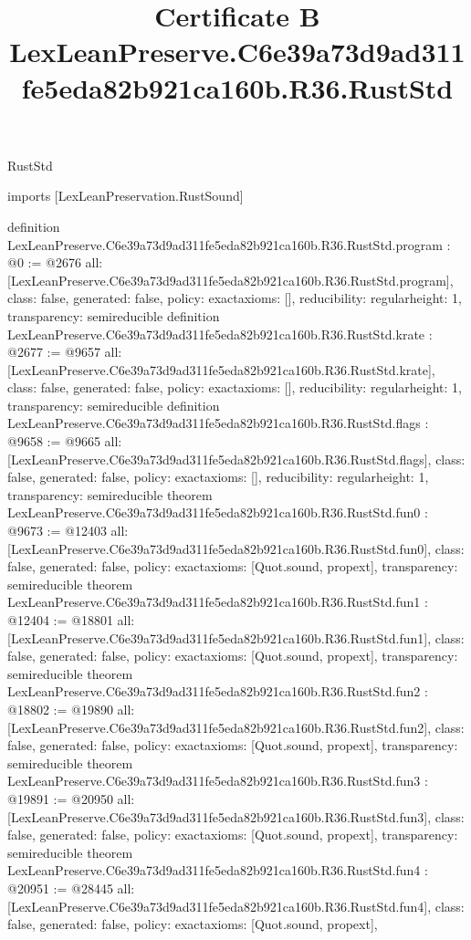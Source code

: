 \begin{lexlean}{RustStd}
\title{Certificate B LexLeanPreserve.C6e39a73d9ad311fe5eda82b921ca160b.R36.RustStd}
\begin{coremodule}
imports [LexLeanPreservation.RustSound]

definition LexLeanPreserve.C6e39a73d9ad311fe5eda82b921ca160b.R36.RustStd.program : @0 := @2676 {
  all: [LexLeanPreserve.C6e39a73d9ad311fe5eda82b921ca160b.R36.RustStd.program],
  class: false,
  generated: false,
  policy: exact{axioms: []},
  reducibility: regular{height: 1},
  transparency: semireducible
}
definition LexLeanPreserve.C6e39a73d9ad311fe5eda82b921ca160b.R36.RustStd.krate : @2677 := @9657 {
  all: [LexLeanPreserve.C6e39a73d9ad311fe5eda82b921ca160b.R36.RustStd.krate],
  class: false,
  generated: false,
  policy: exact{axioms: []},
  reducibility: regular{height: 1},
  transparency: semireducible
}
definition LexLeanPreserve.C6e39a73d9ad311fe5eda82b921ca160b.R36.RustStd.flags : @9658 := @9665 {
  all: [LexLeanPreserve.C6e39a73d9ad311fe5eda82b921ca160b.R36.RustStd.flags],
  class: false,
  generated: false,
  policy: exact{axioms: []},
  reducibility: regular{height: 1},
  transparency: semireducible
}
theorem LexLeanPreserve.C6e39a73d9ad311fe5eda82b921ca160b.R36.RustStd.fun0 : @9673 := @12403 {
  all: [LexLeanPreserve.C6e39a73d9ad311fe5eda82b921ca160b.R36.RustStd.fun0],
  class: false,
  generated: false,
  policy: exact{axioms: [Quot.sound, propext]},
  transparency: semireducible
}
theorem LexLeanPreserve.C6e39a73d9ad311fe5eda82b921ca160b.R36.RustStd.fun1 : @12404 := @18801 {
  all: [LexLeanPreserve.C6e39a73d9ad311fe5eda82b921ca160b.R36.RustStd.fun1],
  class: false,
  generated: false,
  policy: exact{axioms: [Quot.sound, propext]},
  transparency: semireducible
}
theorem LexLeanPreserve.C6e39a73d9ad311fe5eda82b921ca160b.R36.RustStd.fun2 : @18802 := @19890 {
  all: [LexLeanPreserve.C6e39a73d9ad311fe5eda82b921ca160b.R36.RustStd.fun2],
  class: false,
  generated: false,
  policy: exact{axioms: [Quot.sound, propext]},
  transparency: semireducible
}
theorem LexLeanPreserve.C6e39a73d9ad311fe5eda82b921ca160b.R36.RustStd.fun3 : @19891 := @20950 {
  all: [LexLeanPreserve.C6e39a73d9ad311fe5eda82b921ca160b.R36.RustStd.fun3],
  class: false,
  generated: false,
  policy: exact{axioms: [Quot.sound, propext]},
  transparency: semireducible
}
theorem LexLeanPreserve.C6e39a73d9ad311fe5eda82b921ca160b.R36.RustStd.fun4 : @20951 := @28445 {
  all: [LexLeanPreserve.C6e39a73d9ad311fe5eda82b921ca160b.R36.RustStd.fun4],
  class: false,
  generated: false,
  policy: exact{axioms: [Quot.sound, propext]},
}
\end{coremodule}
\end{lexlean}
